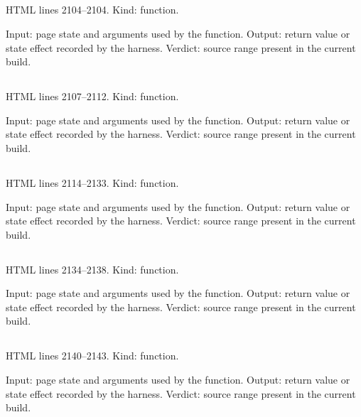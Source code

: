 \subsection*{\texttt{}}
\label{vf_35_cv}
HTML lines 2104--2104. Kind: function.

Input: page state and arguments used by the function.
Output: return value or state effect recorded by the harness.
Verdict: source range present in the current build.

\subsection*{\texttt{}}
\label{vf_36_lgamma}
HTML lines 2107--2112. Kind: function.

Input: page state and arguments used by the function.
Output: return value or state effect recorded by the harness.
Verdict: source range present in the current build.

\subsection*{\texttt{}}
\label{vf_37_betacf}
HTML lines 2114--2133. Kind: function.

Input: page state and arguments used by the function.
Output: return value or state effect recorded by the harness.
Verdict: source range present in the current build.

\subsection*{\texttt{}}
\label{vf_38_betai}
HTML lines 2134--2138. Kind: function.

Input: page state and arguments used by the function.
Output: return value or state effect recorded by the harness.
Verdict: source range present in the current build.

\subsection*{\texttt{}}
\label{vf_39_tDistTwoTail}
HTML lines 2140--2143. Kind: function.

Input: page state and arguments used by the function.
Output: return value or state effect recorded by the harness.
Verdict: source range present in the current build.

